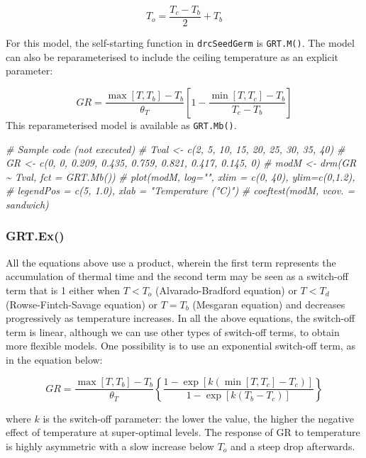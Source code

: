 \documentclass[
]{book}
\newenvironment{Shaded}{\begin{snugshade}}{\end{snugshade}}
\newcommand{\CommentTok}[1]{\textcolor[rgb]{0.56,0.35,0.01}{\textit{#1}}}
\begin{document}
\[T_o = \frac{T_c - T_b}{2} + T_b\]

For this model, the self-starting function in \texttt{drcSeedGerm} is \texttt{GRT.M()}. The model can also be reparameterised to include the ceiling temperature as an explicit parameter:

\[GR = \frac{\max \left[ T, T_b \right] - T_b}{\theta_{T}} \left[ 1 - \frac{\min \left[ T, T_c \right] - T_b}{T_c - T_b}  \right]\]
This reparameterised model is available as \texttt{GRT.Mb()}.

\begin{Shaded}
\begin{Highlighting}[]
\CommentTok{\# Sample code (not executed)}
\CommentTok{\# Tval \textless{}{-} c(2, 5, 10, 15, 20, 25, 30, 35, 40)}
\CommentTok{\# GR \textless{}{-} c(0, 0, 0.209, 0.435, 0.759, 0.821, 0.417, 0.145, 0)}
\CommentTok{\# modM \textless{}{-} drm(GR \textasciitilde{} Tval, fct = GRT.Mb())}
\CommentTok{\# plot(modM, log="", xlim = c(0, 40), ylim=c(0,1.2),}
\CommentTok{\#      legendPos = c(5, 1.0), xlab = "Temperature (°C)")}
\CommentTok{\# coeftest(modM, vcov. = sandwich)}
\end{Highlighting}
\end{Shaded}

\hypertarget{grt.ex}{%
\subsubsection{GRT.Ex()}\label{grt.ex}}

All the equations above use a product, wherein the first term represents the accumulation of thermal time and the second term may be seen as a switch-off term that is 1 either when \(T < T_o\) (Alvarado-Bradford equation) or \(T < T_d\) (Rowse-Fintch-Savage equation) or \(T = T_b\) (Mesgaran equation) and decreases progressively as temperature increases. In all the above equations, the switch-off term is linear, although we can use other types of switch-off terms, to obtain more flexible models. One possibility is to use an exponential switch-off term, as in the equation below:

\[ GR = \frac{\max \left[T, T_b \right] - T_b}{\theta_T} \left\{ \frac{1 - \exp \left[ k (\min \left[T, T_c \right] - T_c) \right]}{1 - \exp \left[ k (T_b - T_c) \right]}  \right\}\]

where \(k\) is the switch-off parameter: the lower the value, the higher the negative effect of temperature at super-optimal levels. The response of GR to temperature is highly asymmetric with a slow increase below \(T_o\) and a steep drop afterwards.
\end{document}
